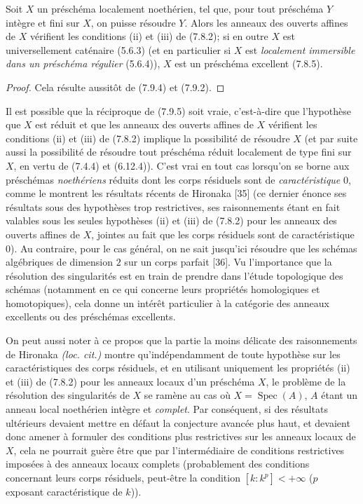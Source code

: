 \begin{proposition}[7.9.5]
\label{IV.2.s7.9.5-fr}
Soit $X$ un préschéma localement noethérien, tel que, pour tout préschéma $Y$
intègre et fini sur $X$, on puisse résoudre $Y$. Alors les anneaux des ouverts
affines de $X$ vérifient les conditions \textup{(ii)} et \textup{(iii)} de \textup{(7.8.2)}; si en outre
$X$ est universellement caténaire \textup{(5.6.3) (et}
\textup{en particulier si $X$ est \emph{localement immersible dans un préschéma
régulier} (5.6.4))}, $X$ est un préschéma excellent \textup{(7.8.5)}.
\end{proposition}

\begin{proof}
Cela résulte aussitôt de (7.9.4) et (7.9.2).
\end{proof}

\begin{remark}[7.9.6]
\label{IV.2.s7.9.6-fr}
Il est possible que la réciproque de (7.9.5) soit vraie, c'est-à-dire que
l'hypothèse que $X$ est réduit et que les anneaux des ouverts affines de $X$
vérifient les conditions (ii) et (iii) de (7.8.2) implique la possibilité de
résoudre $X$ (et par suite aussi la possibilité de résoudre tout préschéma
réduit localement de type fini sur $X$, en vertu de (7.4.4) et (6.12.4)).
C'est vrai en tout cas lorsqu'on se borne aux préschémas \emph{noethériens} réduits
dont les corps résiduels sont de \emph{caractéristique} $0$, comme le montrent
les résultats récents de Hironaka [35] (ce dernier énonce ses résultats sous
des hypothèses trop restrictives, ses raisonnements étant en fait valables
sous les seules hypothèses (ii) et (iii) de (7.8.2) pour les anneaux des
ouverts affines de $X$, jointes au fait que les corps résiduels sont de
caractéristique $0$). Au contraire, pour le cas général, on ne sait jusqu'ici
résoudre que les schémas algébriques de dimension $2$ sur un corps parfait
[36]. Vu l'importance que la résolution des singularités est en train de
prendre dans l'étude topologique des schémas (notamment en ce qui concerne
leurs propriétés homologiques et homotopiques), cela donne un intérêt
particulier à la catégorie des anneaux excellents ou des préschémas
excellents.

On peut aussi noter à ce propos que la partie la moins délicate des
raisonnements de Hironaka \emph{(loc. cit.)} montre qu'indépendamment de toute
hypothèse sur les caractéristiques des corps résiduels, et en utilisant
uniquement les propriétés (ii) et (iii) de (7.8.2) pour les anneaux locaux
d'un préschéma $X$, le problème de la résolution des singularités de $X$ se
ramène au cas où $X=\operatorname{Spec}(A)$, $A$ étant un anneau local
noethérien intègre et \emph{complet}. Par conséquent, si des résultats
ultérieurs devaient mettre en défaut la conjecture avancée plus haut, et
devaient donc amener à formuler des conditions plus restrictives sur les
anneaux locaux de $X$, cela ne pourrait guère être que par l'intermédiaire de
conditions restrictives imposées à des anneaux locaux complets (probablement
des conditions concernant leurs corps résiduels, peut-être la condition
$[k:k^p]<+\infty$ ($p$ exposant caractéristique de $k$)).
\end{remark}

